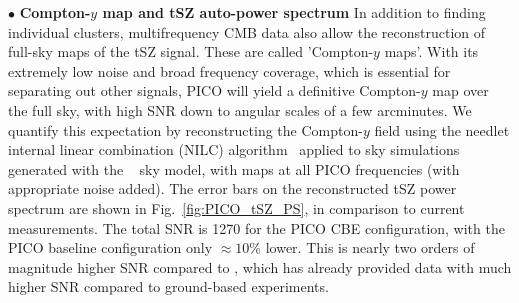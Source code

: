 \documentclass[PICOReport.tex]{subfiles}
\begin{document}
%
\noindent$\bullet$ {\bf Compton-$y$ map and tSZ auto-power spectrum} \hspace{0.1in} \label{ymap}  In addition to finding individual clusters, multifrequency CMB data also allow the reconstruction of full-sky maps of the tSZ signal. These are called  'Compton-$y$ maps'. %
With its extremely low noise and broad frequency coverage, which is essential for separating out other signals, PICO will yield a definitive Compton-$y$ map over the full sky, with high \ac{SNR} down to angular scales of a few arcminutes.  We quantify this expectation by reconstructing the Compton-$y$ field using the needlet internal linear combination (NILC) algorithm~\citep{Delabrouille2009} applied to sky simulations generated with the \planck~ sky model, with maps at all PICO frequencies (with appropriate noise added).  The error bars on the reconstructed tSZ power spectrum are shown in Fig.~\ref{fig:PICO_tSZ_PS}, in comparison to current measurements.  The total \ac{SNR} is 1270 for the PICO CBE configuration, with the PICO baseline configuration only $\approx 10$\% lower.  This is nearly two orders of magnitude higher \ac{SNR} compared to \planck , which has already provided data with much higher \ac{SNR} compared to ground-based experiments. 
\end{document}
